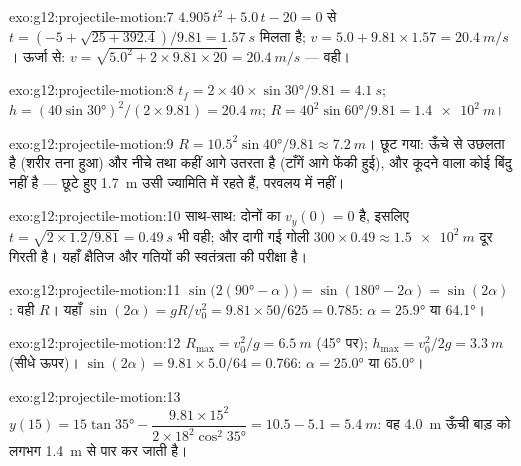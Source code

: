 \begin{solution}{exo:g12:projectile-motion:7}
$4.905\,t^2 + 5.0\,t - 20 = 0$ से $t = (-5 + \sqrt{25 + 392.4})/9.81 = \qty{1.57}{s}$ मिलता है; $v = 5.0 + 9.81 \times 1.57 = \qty{20.4}{m/s}$। ऊर्जा से: $v = \sqrt{5.0^2 + 2 \times 9.81 \times 20} = \qty{20.4}{m/s}$ --- वही।
\end{solution}

\begin{solution}{exo:g12:projectile-motion:8}
$t_f = 2 \times 40 \times \sin\ang{30}/9.81 = \qty{4.1}{s}$; $h = (40\sin\ang{30})^2/(2 \times 9.81) = \qty{20.4}{m}$; $R = 40^2 \sin\ang{60}/9.81 = \qty{1.4e2}{m}$।
\end{solution}

\begin{solution}{exo:g12:projectile-motion:9}
$R = 10.5^2\sin\ang{40}/9.81 \approx \qty{7.2}{m}$। छूट गया:  ऊँचे से उछलता है (शरीर तना हुआ) और
नीचे तथा कहीं आगे उतरता है (टाँगें आगे फेंकी हुई), और कूदने वाला कोई बिंदु
नहीं है --- छूटे हुए \qty{1.7}{m} उसी ज्यामिति में रहते हैं, परवलय में नहीं।
\end{solution}

\begin{solution}{exo:g12:projectile-motion:10}
साथ-साथ: दोनों का $v_y(0) = 0$ है, इसलिए $t = \sqrt{2 \times 1.2/9.81} = \qty{0.49}{s}$ भी वही; और दागी गई गोली $300 \times 0.49 \approx \qty{1.5e2}{m}$ दूर
गिरती है। यहाँ क्षैतिज और  गतियों की स्वतंत्रता की परीक्षा है।
\end{solution}

\begin{solution}{exo:g12:projectile-motion:11}
$\sin\bigl(2(\ang{90}-\alpha)\bigr) = \sin(\ang{180}-2\alpha) =
\sin(2\alpha)$: वही $R$। यहाँ $\sin(2\alpha) = gR/v_0^2 =
9.81 \times 50/625 = 0.785$: $\alpha = \ang{25.9}$ या \ang{64.1}।
\end{solution}

\begin{solution}{exo:g12:projectile-motion:12}
$R_{\max} = v_0^2/g = \qty{6.5}{m}$ (\ang{45} पर); $h_{\max} = v_0^2/2g = \qty{3.3}{m}$ (सीधे ऊपर)। $\sin(2\alpha) = 9.81 \times 5.0/64 = 0.766$: $\alpha = \ang{25.0}$ या \ang{65.0}।
\end{solution}

\begin{solution}{exo:g12:projectile-motion:13}
$y(15) = 15\tan\ang{35} - \dfrac{9.81 \times 15^2}
{2 \times 18^2 \cos^2\ang{35}} = 10.5 - 5.1 = \qty{5.4}{m}$: वह \qty{4.0}{m} ऊँची बाड़ को लगभग \qty{1.4}{m} से पार कर जाती है।
\end{solution}

